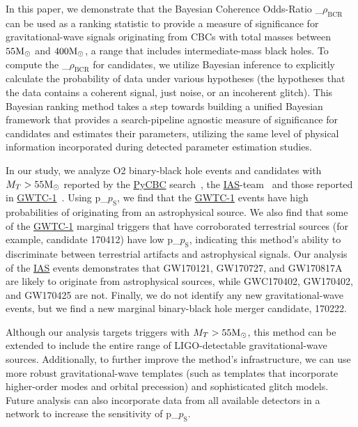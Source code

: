 \documentclass[%
 nofootinbib,
 amsmath,amssymb,
 aps,
 twocolumn,
 superscriptaddress
]{revtex4-2}
\newcommand{\pycbc}{{\sc \href{https://pycbc.org/}{{PyCBC}}}\xspace}
\newcommand{\GWTC}{{\sc \href{https://ui.adsabs.harvard.edu/abs/2019PhRvX...9c1040A/abstract}{{GWTC-1}}}\xspace}
\newcommand{\IAS}{{\sc \href{https://ui.adsabs.harvard.edu/abs/2020PhRvD.101h3030V/abstract}{{IAS}}}\xspace}
\newcommand{\fancytext}[1]{{\relax\ifmmode#1\else $#1$\fi}\xspace}
\newcommand{\mathcmd}[1]{{\sc \relax\ifmmode#1\else $#1$\fi}\xspace}
\newcommand{\bcr}{\mathcmd{\rho_\text{BCR}}}
\newcommand{\msun}{\mathcmd{\text{M}_\odot}}
\newcommand{\pastrobcr}{\fancytext{p_\text{S}}}
\newcommand{\avi}[1]{\textcolor{orange}{[AV: #1]}}
\newcommand{\greg}[1]{\textcolor{purple}{[Greg: #1]}}
\begin{document}
In this paper, we demonstrate that the Bayesian Coherence Odds-Ratio \bcr~\cite{BCR1} can be used as a ranking statistic to provide a measure of significance for gravitational-wave signals originating from CBCs with total masses between $55\msun$ and $400\msun$, a range that includes intermediate-mass black holes. To compute the \bcr for candidates, we utilize Bayesian inference to explicitly calculate the probability of data under various hypotheses (the hypotheses that the data contains a coherent signal, just noise, or an incoherent glitch). This Bayesian ranking method takes a step towards building a unified Bayesian framework that provides a search-pipeline agnostic measure of significance for candidates and estimates their parameters, utilizing the same level of physical information incorporated during detected parameter estimation studies. 

In our study, we analyze O2 binary-black hole events and candidates with $M_T > 55 \msun$ reported by the \pycbc search~\cite{pycbc_ogc_2}, the \IAS-team~\cite{IAS1, IAS2} and those reported in \GWTC~\cite{GWTC1}. Using \pastrobcr, we find that the \GWTC events have high probabilities of originating from an astrophysical source. We also find that some of the \GWTC marginal triggers that have corroborated terrestrial sources (for example, candidate 170412) have low \pastrobcr, indicating this method's ability to discriminate between terrestrial artifacts and astrophysical signals. Our analysis of the \IAS events demonstrates that GW170121, GW170727, and GW170817A are likely to originate from astrophysical sources, while GWC170402, GW170402, and GW170425  are not. Finally, we do not identify any new gravitational-wave events, but we find a new marginal binary-black hole merger candidate, 170222. 

Although our analysis targets triggers with $M_T > 55 \msun$, this method can be extended to include the entire range of LIGO-detectable gravitational-wave sources. Additionally, to further improve the method's infrastructure, we can use more robust gravitational-wave templates (such as templates that incorporate higher-order modes and orbital precession) and sophisticated glitch models. Future analysis can also incorporate data from all available detectors in a network to increase the sensitivity of \pastrobcr. 



\end{document}
